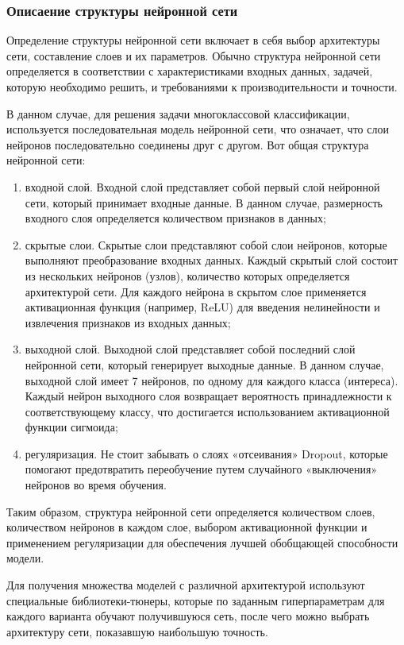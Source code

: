 \subsubsection{Описаение структуры нейронной сети}

Определение структуры нейронной сети включает в себя выбор архитектуры сети, составление слоев и их параметров. Обычно структура нейронной сети определяется в соответствии с характеристиками входных данных, задачей, которую необходимо решить, и требованиями к производительности и точности.

В данном случае, для решения задачи многоклассовой классификации, используется последовательная модель нейронной сети, что означает, что слои нейронов последовательно соединены друг с другом. Вот общая структура нейронной сети:
\begin{enumerate}
    \item входной слой. Входной слой представляет собой первый слой нейронной сети, который принимает входные данные. В данном случае, размерность входного слоя определяется количеством признаков в данных;
    \item скрытые слои. Скрытые слои представляют собой слои нейронов, которые выполняют преобразование входных данных. Каждый скрытый слой состоит из нескольких нейронов (узлов), количество которых определяется архитектурой сети. Для каждого нейрона в скрытом слое применяется активационная функция (например, ReLU) для введения нелинейности и извлечения признаков из входных данных;
    \item выходной слой. Выходной слой представляет собой последний слой нейронной сети, который генерирует выходные данные. В данном случае, выходной слой имеет 7 нейронов, по одному для каждого класса (интереса). Каждый нейрон выходного слоя возвращает вероятность принадлежности к соответствующему классу, что достигается использованием активационной функции сигмоида;
    \item регуляризация. Не стоит забывать о слоях «отсеивания» Dropout, которые помогают предотвратить переобучение путем случайного «выключения» нейронов во время обучения.
\end{enumerate}

Таким образом, структура нейронной сети определяется количеством слоев, количеством нейронов в каждом слое, выбором активационной функции и применением регуляризации для обеспечения лучшей обобщающей способности модели.

Для получения множества моделей с различной архитектурой используют специальные библиотеки-тюнеры, которые по заданным гиперпараметрам для каждого варианта обучают получившуюся сеть, после чего можно выбрать архитектуру сети, показавшую наибольшую точность.

